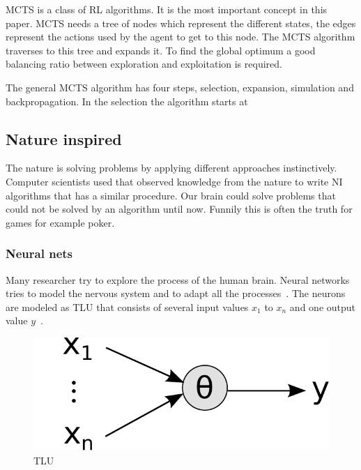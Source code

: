 \ac{MCTS} is a class of \ac{RL} algorithms. It is the most important concept in this paper. \ac{MCTS} needs a tree of nodes which represent the different states, the edges represent the actions used by the agent to get to this node. The \ac{MCTS} algorithm traverses to this tree and expands it. To find the global optimum a good balancing ratio between exploration and exploitation is required. 



The general \ac{MCTS} algorithm has four steps, selection, expansion, simulation and backpropagation. In the selection the algorithm starts at  


\subsection{Nature inspired} 
The nature is solving problems by applying different approaches instinctively. Computer scientists used that observed knowledge from the
nature to write \ac{NI} algorithms that has a similar procedure. Our brain could solve problems that could not be solved by an algorithm until now. Funnily this is often the truth for games for example poker.

\subsubsection{Neural nets} 
Many researcher try to explore the process of the human brain. Neural networks tries to model the nervous system and to adapt all the processes~\cite{nn_intro}. The neurons are modeled as \ac{TLU} that consists of several input values $x_1$ to $x_n$ and one output value $y$~\cite{ci_kruse}. 


\begin{figure}
\centering
\includegraphics[scale=0.5]{images/tlu.pdf}
\caption{\ac{TLU}~\cite{ci_kruse}}
\label{fig:tlu}
\end{figure}



